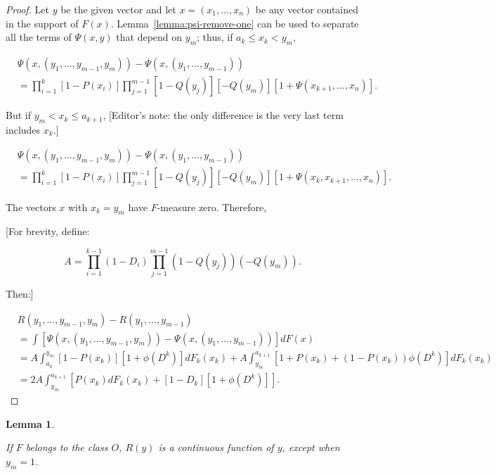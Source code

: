 \documentclass{article}
\newtheorem{lemma}{Lemma}
\begin{document}
\begin{proof}

Let $y$ be the given vector and let $x = (x_1, \dots, x_n)$ be any vector
contained in the support of $F(x)$. Lemma~\ref{lemma:psi-remove-one} can be
used to separate all the terms of $\Psi(x, y)$ that depend on $y_m$; thus, if
$a_k \leq x_k < y_m$,

\[
\begin{aligned}
&\Psi(x, (y_1, \dots, y_{m-1}, y_m)) - \Psi(x, (y_1, \dots, y_{m-1})) \\
&= \prod_{i=1}^k [1 - P(x_i)] \prod_{j=1}^{m-1} [1 - Q(y_j)][-Q(y_m)]
[1 + \Psi(x_{k+1}, \dots, x_n)].
\end{aligned}
\]

But if $y_m < x_k \leq a_{k+1}$, [Editor's note: the only difference is the
very last term includes $x_k$.]

\[
\begin{aligned}
&\Psi(x, (y_1, \dots, y_{m-1}, y_m)) - \Psi(x, (y_1, \dots, y_{m-1})) \\
&= \prod_{i=1}^k [1 - P(x_i)] \prod_{j=1}^{m-1} [1 - Q(y_j)][-Q(y_m)]
[1 + \Psi(x_k, x_{k+1}, \dots, x_n)].
\end{aligned}
\]

The vectors $x$ with $x_k = y_m$ have $F$-measure zero. Therefore,

[For brevity, define:

\[
A = \prod_{i=1}^{k-1} (1 - D_i) \prod_{j=1}^{m-1} (1 - Q(y_j))(-Q(y_m)).
\]

Then:]

\[
\begin{aligned}
& R(y_1, \dots, y_{m-1}, y_m) - R(y_1, \dots, y_{m-1}) \\
&= \int [\Psi(x, (y_1, \dots, y_{m-1}, y_m)) - \Psi(x, (y_1, \dots, y_{m-1}))] dF(x) \\
&= A \int_{a_k}^{y_m} [1 - P(x_k)][1 + \phi(D^k)] dF_k(x_k)
+ A \int_{y_m}^{a_{k+1}} [1 + P(x_k) + (1 - P(x_k)) \phi(D^k)] dF_k(x_k) \\
&= 2A \int_{y_m}^{a_{k+1}} \left [
    P(x_k) dF_k(x_k) + [1 - D_k][1 + \phi(D^k)]
\right ].
\end{aligned}
\]

\end{proof}

\begin{lemma} \label{lemma:r-is-continuous}

If $F$ belongs to the class $O$, $R(y)$ is a continuous function of $y$, except
when $y_m = 1$.

\end{lemma}
\end{document}
